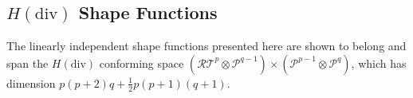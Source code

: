 %
%
%
%


\subsection{\texorpdfstring{$H(\mathrm{div})$}{Hdiv} Shape Functions}
The linearly independent shape functions presented here are shown to belong and span the $H(\mathrm{div})$ conforming space $(\mathcal{RT}^p\otimes\mathcal{P}^{q-1})\times(\mathcal{P}^{p-1}\otimes\mathcal{P}^q)$, which has dimension $p(p+2)q+\frac{1}{2}p(p+1)(q+1)$.

